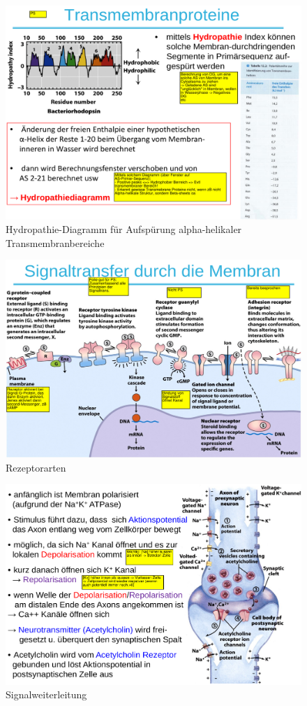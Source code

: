 \documentclass[a4paper,twocolumn,usegeometry,english,fontsize=6,DIV=16]{scrartcl}
\begin{document}
\begin{figure}
	\centering
	\includegraphics[width=\linewidth]{img/hydropathie.png}
	\caption{Hydropathie-Diagramm für Aufspürung alpha-helikaler Transmembranbereiche}
\end{figure}

\begin{figure}
	\centering
	\includegraphics[width=\linewidth]{img/signaltransfer.png}
	\caption{Rezeptorarten}
\end{figure}

\begin{figure}
	\centering
	\includegraphics[width=\linewidth]{img/signalweiterleitung.png}
	\caption{Signalweiterleitung}
\end{figure}
\end{document}
